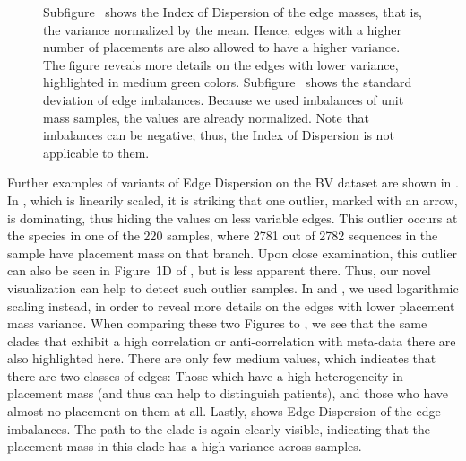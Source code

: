 \begin{figure}[!htpb]
{%
        Subfigure~
        shows the Index of Dispersion of the edge masses, that is, the variance normalized by the mean.
        Hence, edges with a higher number of placements are also allowed to have a higher variance.
        The figure reveals more details on the edges with lower variance, highlighted in medium green colors.
        Subfigure~
        shows the standard deviation of edge imbalances.
        Because we used imbalances of unit mass samples, the values are already normalized.
        Note that imbalances can be negative; thus, the Index of Dispersion is not applicable to them.
    }
    \label{fig:all_dispersions}
\end{figure}


Further examples of variants of Edge Dispersion on the \ac{BV} dataset are shown in .
In , which is linearily scaled,
it is striking that one outlier, marked with an arrow, is dominating, thus hiding the values on less variable edges.
This outlier occurs at the species  in one of the \num{220} samples,
where \num{2 781} out of \num{2 782} sequences in the sample have placement mass on that branch.
Upon close examination, this outlier can also be seen in Figure~1D of \cite{Srinivasan2012},
but is less apparent there.
Thus, our novel visualization can help to detect such outlier samples.
In  and ,
we used logarithmic scaling instead, in order to reveal more details on the edges with lower placement mass variance.
When comparing these two Figures to ,
we see that the same clades that exhibit a high correlation or anti-correlation with meta-data there
are also highlighted here.
There are only few medium values, which indicates that there are two classes of edges:
Those which have a high heterogeneity in placement mass (and thus can help to distinguish patients),
and those who have almost no placement on them at all.
Lastly,  shows Edge Dispersion of the edge imbalances.
The path to the  clade is again clearly visible,
indicating that the placement mass in this clade has a high variance across samples.

